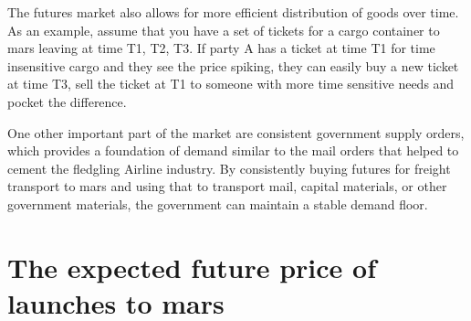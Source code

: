 \documentclass[10pt]{article}
\begin{document}
The futures market also allows for more efficient distribution of goods over time. As an example, assume that you have a set of tickets for a cargo container to mars leaving at time T1, T2, T3. If party A has a ticket at time T1 for time insensitive cargo and they see the price spiking, they can easily buy a new ticket at time T3, sell the ticket at T1 to someone with more time sensitive needs and pocket the difference. 

One other important part of the market are consistent government supply orders, which provides a foundation of demand similar to the mail orders that helped to cement the fledgling Airline industry. By consistently buying futures for freight transport to mars and using that to transport mail, capital materials, or other government materials, the government can maintain a stable demand floor.

\section{The expected future price of launches to mars}
\end{document}
